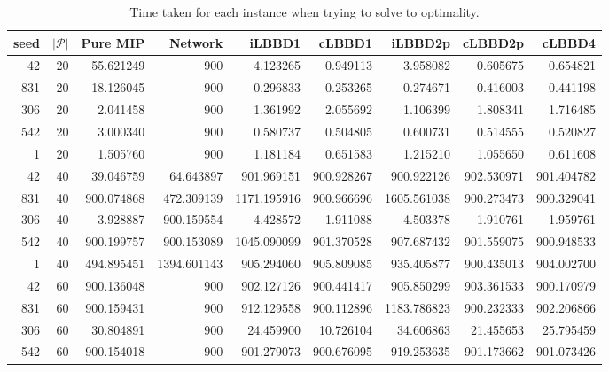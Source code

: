 \begin{table*}
    \centering
    \caption{Time taken for each instance when trying to solve to optimality.}
    \begin{tabular}{rrrrrrrrr} \toprule
        seed & $|\mathcal{P}|$ & Pure MIP & Network & iLBBD1 & cLBBD1 & iLBBD2p & cLBBD2p & cLBBD4 \\\midrule
        42     &       20    & 55.621249 &  900     & 4.123265 &  0.949113 & 3.958082 & 0.605675 & 0.654821 \\
       831     &       20    &18.126045 &   900     & 0.296833 &  0.253265 & 0.274671 & 0.416003 & 0.441198 \\
      306       &     20     &2.041458  &   900     & 1.361992 & 2.055692 & 1.106399 & 1.808341 & 1.716485 \\
      542       &     20     &3.000340  &  900     &  0.580737 & 0.504805 & 0.600731 & 0.514555 & 0.520827 \\
        1      &      20     &1.505760  &  900     & 1.181184 & 0.651583 & 1.215210 & 1.055650 & 0.611608 \\\midrule
       42      &      40    &   39.046759 & 64.643897  &  901.969151 & 900.928267  & 900.922126 &  902.530971 & 901.404782 \\
     831       &     40    & 900.074868 &  472.309139   &  1171.195916 & 900.966696 & 1605.561038 &  900.273473 & 900.329041 \\
     306       &     40    &  3.928887 &   900.159554   &     4.428572  &  1.911088  &   4.503378  &  1.910761  &  1.959761 \\
    542       &     40   & 900.199757 &   900.153089   &  1045.090099  & 901.370528  & 907.687432 &  901.559075 & 900.948533 \\
     1        &    40  &  494.895451  &  1394.601143    &  905.294060 &  905.809085  &  935.405877 & 900.435013 & 904.002700 \\\midrule
     42       &     60 &  900.136048  &   900   & 902.127126 &  900.441417  & 905.850299 &  903.361533 &  900.170979 \\
     831      &      60 &  900.159431  &   900   & 912.129558 & 900.112896 & 1183.786823 &  900.232333 &  902.206866 \\
     306      &      60  &  30.804891 &   900   &  24.459900  & 10.726104  &  34.606863 &  21.455653 &  25.795459 \\
     542      &      60 & 900.154018 &   900   &  901.279073 & 900.676095 &  919.253635 & 901.173662 & 901.073426 \\

\end{tabular}
\end{table*}
